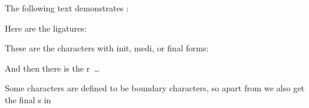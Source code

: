 \documentclass{article}
\begin{document}
\noindent
The following text demonstrates :
\bigskip



\medskip
\noindent
Here are the ligatures:\par
{}

\noindent
These are the characters with init, medi, or final forms:\par
{}

\noindent
And then there is the r~\ldots\par
{}

\noindent
Some characters are defined to be boundary characters, so apart from  we also get the final s in 
\end{document}

